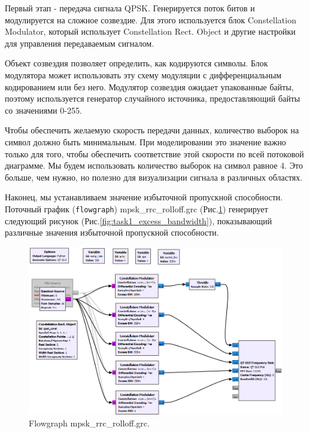\documentclass[a4paper, 14pt]{extarticle}
\begin{document}
    Первый этап - передача сигнала QPSK. Генерируется поток битов и модулируется на сложное созвездие.
    Для этого используется блок Constellation Modulator, который использует Constellation Rect. Object и другие
    настройки для управления передаваемым сигналом.

    Объект созвездия позволяет определить, как кодируются символы.
    Блок модулятора может использовать эту схему модуляции с дифференциальным кодированием или без него.
    Модулятор созвездия ожидает упакованные байты, поэтому используется генератор случайного источника, предоставляющий
    байты со значениями 0-255.

    Чтобы обеспечить желаемую скорость передачи данных, количество выборок на символ должно быть минимальным.
    При моделировании это значение важно только для того, чтобы обеспечить соответствие этой скорости по всей
    потоковой диаграмме.
    Мы будем использовать количество выборок на символ равное 4.
    Это больше, чем нужно, но полезно для визуализации сигнала в различных областях.

    Наконец, мы устанавливаем значение избыточной пропускной способности.
    Поточный график (\texttt{flowgraph}) mpsk\_rrc\_rolloff.grc (Рис.\ref{fig:task1_flowgraph}) генерирует следующий
    рисунок (Рис.\ref{fig:task1_excess_bandwidth}), показывающий различные значения избыточной пропускной способности.

    \begin{figure}[H]
        \centering
        \includegraphics[width=0.75\linewidth]{resources/Images/task1_mpsk_rrc_rolloff}
        \caption{Flowgraph mpsk\_rrc\_rolloff.grc.}
        \label{fig:task1_flowgraph}
    \end{figure}
\end{document}
